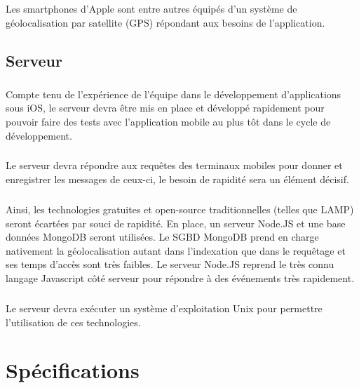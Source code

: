 \documentclass[a4paper,12pt]{report}
\begin{document}
\begin{onehalfspace}
	\paragraph*{}
	Les smartphones d'Apple sont entre autres équipés d'un système de géolocalisation par satellite (GPS) répondant aux besoins de l'application.

	\section*{Serveur}
	
	\paragraph*{}
	Compte tenu de l'expérience de l'équipe dans le développement d'applications sous iOS, le serveur devra être mis en place et développé rapidement pour pouvoir faire des tests avec l'application mobile au plus tôt dans le cycle de développement.

	\paragraph*{}
	Le serveur devra répondre aux requêtes des terminaux mobiles pour donner et enregistrer les messages de ceux-ci, le besoin de rapidité sera un élément décisif.
	
	\paragraph*{}
	Ainsi, les technologies gratuites et open-source traditionnelles (telles que LAMP) seront écartées par souci de rapidité. En place, un serveur Node.JS et une base données MongoDB seront utilisées.
	Le SGBD MongoDB prend en charge nativement la géolocalisation autant dans l’indexation que dans le requêtage et ses temps d'accès sont très faibles.
	Le serveur Node.JS reprend le très connu langage Javascript côté serveur pour répondre à des événements très rapidement.
	
	\paragraph*{}
	Le serveur devra exécuter un système d'exploitation Unix pour permettre l'utilisation de ces technologies.
	
	
	\chapter*{Spécifications}


\end{onehalfspace}
\end{document}
